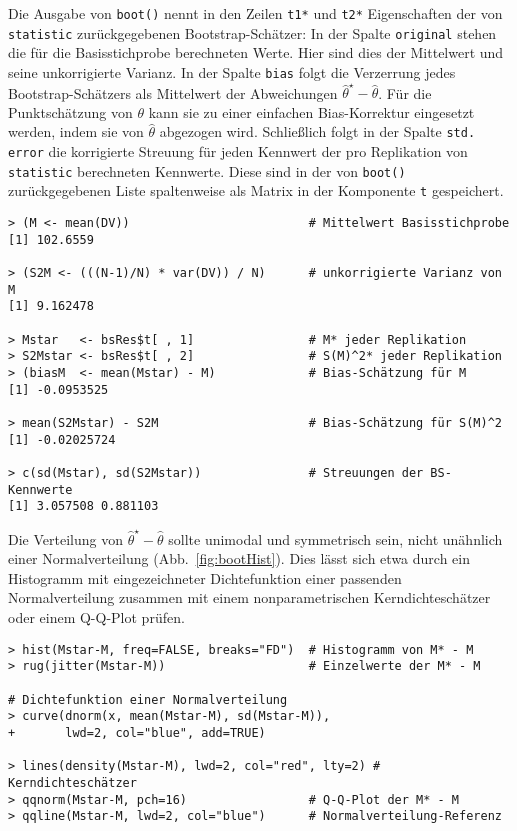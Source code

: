 Die Ausgabe von \lstinline!boot()! nennt in den Zeilen \lstinline!t1*! und \lstinline!t2*! Eigenschaften der von \lstinline!statistic! zurückgegebenen Bootstrap-Schätzer: In der Spalte \lstinline!original! stehen die für die Basisstichprobe berechneten Werte. Hier sind dies der Mittelwert und seine unkorrigierte Varianz. In der Spalte \lstinline!bias! folgt die Verzerrung jedes Bootstrap-Schätzers als Mittelwert der Abweichungen $\hat{\theta}^{\star} - \hat{\theta}$. Für die Punktschätzung von $\theta$ kann sie zu einer einfachen Bias-Korrektur eingesetzt werden, indem sie von $\hat{\theta}$ abgezogen wird. Schließlich folgt in der Spalte \lstinline!std. error! die korrigierte Streuung für jeden Kennwert der pro Replikation von \lstinline!statistic! berechneten Kennwerte. Diese sind in der von \lstinline!boot()! zurückgegebenen Liste spaltenweise als Matrix in der Komponente \lstinline!t! gespeichert.
\begin{lstlisting}
> (M <- mean(DV))                         # Mittelwert Basisstichprobe
[1] 102.6559

> (S2M <- (((N-1)/N) * var(DV)) / N)      # unkorrigierte Varianz von M
[1] 9.162478

> Mstar   <- bsRes$t[ , 1]                # M* jeder Replikation
> S2Mstar <- bsRes$t[ , 2]                # S(M)^2* jeder Replikation
> (biasM  <- mean(Mstar) - M)             # Bias-Schätzung für M
[1] -0.0953525

> mean(S2Mstar) - S2M                     # Bias-Schätzung für S(M)^2
[1] -0.02025724

> c(sd(Mstar), sd(S2Mstar))               # Streuungen der BS-Kennwerte
[1] 3.057508 0.881103
\end{lstlisting}

Die Verteilung von $\hat{\theta}^{\star} - \hat{\theta}$ sollte unimodal und symmetrisch sein, nicht unähnlich einer Normalverteilung (Abb.\ \ref{fig:bootHist}). Dies lässt sich etwa durch ein Histogramm mit eingezeichneter Dichtefunktion einer passenden Normalverteilung zusammen mit einem nonparametrischen Kerndichteschätzer oder einem Q-Q-Plot prüfen.
\begin{lstlisting}
> hist(Mstar-M, freq=FALSE, breaks="FD")  # Histogramm von M* - M
> rug(jitter(Mstar-M))                    # Einzelwerte der M* - M

# Dichtefunktion einer Normalverteilung
> curve(dnorm(x, mean(Mstar-M), sd(Mstar-M)),
+       lwd=2, col="blue", add=TRUE)

> lines(density(Mstar-M), lwd=2, col="red", lty=2) # Kerndichteschätzer
> qqnorm(Mstar-M, pch=16)                 # Q-Q-Plot der M* - M
> qqline(Mstar-M, lwd=2, col="blue")      # Normalverteilung-Referenz
\end{lstlisting}

